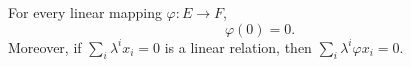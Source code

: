 For every linear mapping $\varphi: E \to F$,
$$\varphi(0) = 0.$$
Moreover, if $\sum_i \lambda^i x_i = 0$ is a linear relation, then $\sum_i \lambda^i \varphi x_i = 0$.
